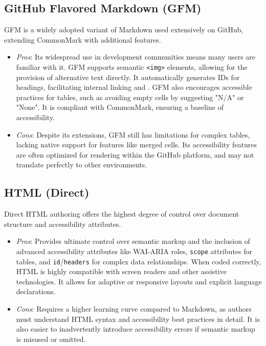 \subsection{GitHub Flavored Markdown (GFM)}
GFM is a widely adopted variant of Markdown used extensively on GitHub, extending CommonMark with additional features. \supercite{GitHubDocs}
\begin{itemize}
	\item \emph{Pros}: Its widespread use in development communities means many users are familiar with it. GFM supports semantic \texttt{<img>} elements, allowing for the provision of alternative text directly. \supercite{GitHubDocs, TestPros} It automatically generates IDs for headings, facilitating internal linking and . \supercite{GitLabDocs} GFM also encourages accessible practices for tables, such as avoiding empty cells by suggesting "N/A" or "None". \supercite{GitLabDocs} It is compliant with CommonMark, ensuring a baseline of accessibility. \supercite{GitHubDocs}
	\item \emph{Cons}: Despite its extensions, GFM still has limitations for complex tables, lacking native support for features like merged cells. \supercite{DocsToMarkdown} Its accessibility features are often optimized for rendering within the GitHub platform, and may not translate perfectly to other environments.
\end{itemize}

\subsection{HTML (Direct)}
Direct HTML authoring offers the highest degree of control over document structure and accessibility attributes.
\begin{itemize}
	\item \emph{Pros}: Provides ultimate control over semantic markup and the inclusion of advanced accessibility attributes like WAI-ARIA roles, \texttt{scope} attributes for tables, and \texttt{id}/\texttt{headers} for complex data relationships. \supercite{MDNHTML, UniversalDesign, MDNTableAccess} When coded correctly, HTML is highly compatible with screen readers and other assistive technologies. \supercite{ReciteMe} It allows for adaptive or responsive layouts and explicit language declarations. \supercite{UniversalDesign, QuartoCommonMark}
	\item \emph{Cons}: Requires a higher learning curve compared to Markdown, as authors must understand HTML syntax and accessibility best practices in detail. \supercite{UniversalDesign} It is also easier to inadvertently introduce accessibility errors if semantic markup is misused or omitted. \supercite{UniversalDesign}
\end{itemize}

